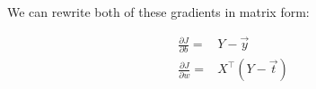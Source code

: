 We can rewrite both of these gradients in matrix form:

\begin{align*}
  \frac{\partial J}{\partial b} =& Y - \vec{y} \\
  \frac{\partial J}{\partial w} =& X^\top(Y - \vec{t})
\end{align*}
